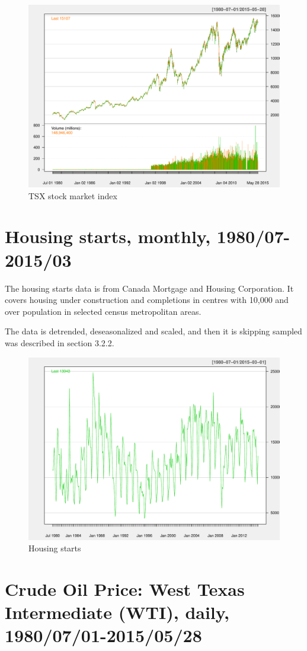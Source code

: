 \begin{figure}[h]
\centering
\includegraphics[width=0.7\linewidth]{Figures/tsx-report}
\caption{TSX stock market index}
\label{fig:tsx-report}
\end{figure}


\section{Housing starts, monthly, 1980/07-2015/03} 

The housing starts data is from Canada Mortgage and Housing Corporation. It covers housing under construction and completions in centres with 10,000 and over population in selected census metropolitan areas. 

The data is detrended, deseasonalized and scaled, and then it is skipping sampled  was described in section 3.2.2. 

\begin{figure}
\centering
\includegraphics[width=0.7\linewidth]{Figures/house-report}
\caption{Housing starts}
\label{fig:house-report}
\end{figure}


\section{Crude Oil Price: West Texas Intermediate (WTI), daily, 1980/07/01-2015/05/28} 

